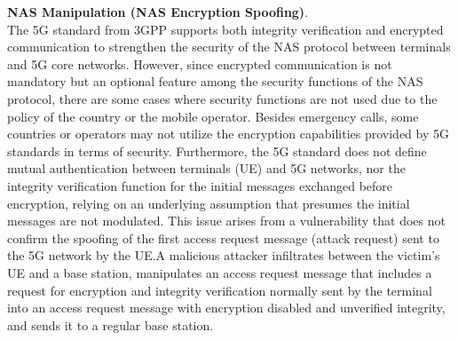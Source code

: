 \documentclass[english]{article}
\begin{document}
\textbf{NAS Manipulation (NAS Encryption Spoofing)}. \\
The 5G standard from 3GPP supports both integrity verification and encrypted
communication to strengthen the security of the NAS protocol between terminals
and 5G core networks. However, since encrypted communication is not mandatory
but an optional feature among the security functions of the NAS protocol,
there are some cases where security functions are not used due to the policy
of the country or the mobile operator. Besides emergency calls, some countries
or operators may not utilize the encryption capabilities provided by 5G
standards in terms of security. Furthermore, the 5G standard does not define
mutual authentication between terminals (UE) and 5G networks, nor the integrity
verification function for the initial messages exchanged before encryption,
relying on an underlying assumption that presumes the initial messages are not
modulated. This issue arises from a vulnerability that does not confirm the
spoofing of the first access request message (attack request) sent to the 5G
network by the UE.\@ A malicious attacker infiltrates between the victim's UE
and a base station, manipulates an access request message that includes a request
for encryption and integrity verification normally sent by the terminal into an
access request message with encryption disabled and unverified integrity, and
sends it to a regular base station.
\end{document}
